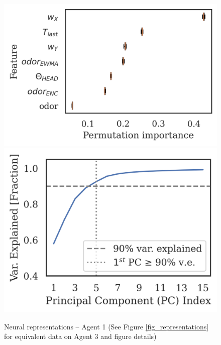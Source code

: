 \documentclass[5p,twocolumn,authoryear]{elsarticle}
\begin{document}
\begin{figure}[h!]
\begin{center}
\includegraphics[width=0.34\linewidth]{repr_2760377.png}
\includegraphics[width=0.30\linewidth]{scree_2760377.png}
\caption[Neural representations -- Agent 1]{Neural representations -- Agent 1 (See Figure \ref{fig_representations} for equivalent data on Agent 3 and figure details)}
\end{center}
\end{figure}
\end{document}
